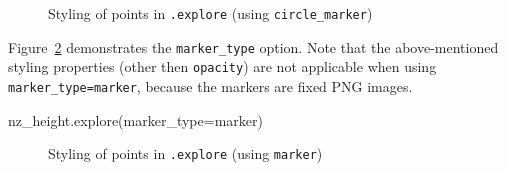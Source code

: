 \documentclass[
  letterpaper,
]{krantz}
\newenvironment{Shaded}{\begin{snugshade}}{\end{snugshade}}
\newcommand{\NormalTok}[1]{\textcolor[rgb]{0.00,0.23,0.31}{#1}}
\newcommand{\OperatorTok}[1]{\textcolor[rgb]{0.37,0.37,0.37}{#1}}
\newcommand{\StringTok}[1]{\textcolor[rgb]{0.13,0.47,0.30}{#1}}
\begin{document}
\begin{figure}


\caption{\label{fig-explore-styling-points}Styling of points in
\texttt{.explore} (using \texttt{circle\_marker})}

\end{figure}%

Figure~\ref{fig-explore-styling-points2} demonstrates the
\texttt{\textquotesingle{}marker\_type\textquotesingle{}} option. Note
that the above-mentioned styling properties (other then
\texttt{opacity}) are not applicable when using
\texttt{marker\_type=\textquotesingle{}marker\textquotesingle{}},
because the markers are fixed PNG images.

\begin{Shaded}
\begin{Highlighting}[]
\NormalTok{nz\_height.explore(marker\_type}\OperatorTok{=}\StringTok{\textquotesingle{}marker\textquotesingle{}}\NormalTok{)}
\end{Highlighting}
\end{Shaded}

\begin{figure}


\caption{\label{fig-explore-styling-points2}Styling of points in
\texttt{.explore} (using \texttt{marker})}

\end{figure}%
\end{document}
